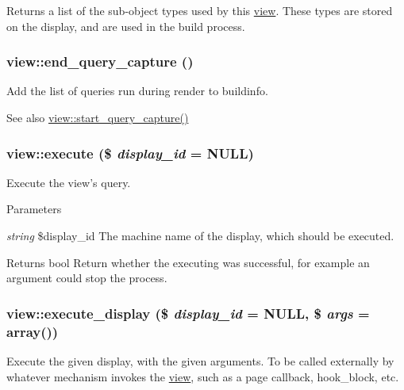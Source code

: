 \label{classview_a1338697759506981e17d1c4772b13aa6}
Returns a list of the sub-\/object types used by this \hyperlink{classview}{view}. These types are stored on the display, and are used in the build process. \hypertarget{classview_a7170a33aff32de00b1ff92ee4483cb88}{
\subsubsection[{end\_\-query\_\-capture}]{\setlength{\rightskip}{0pt plus 5cm}view::end\_\-query\_\-capture ()}}
\label{classview_a7170a33aff32de00b1ff92ee4483cb88}
Add the list of queries run during render to buildinfo.

\begin{DoxySeeAlso}{See also}
\hyperlink{classview_a1e3efc171324e713e7e130c445dbf84d}{view::start\_\-query\_\-capture()} 
\end{DoxySeeAlso}
\hypertarget{classview_ad33e492cac26ffd816fc9ba9361875d1}{
\subsubsection[{execute}]{\setlength{\rightskip}{0pt plus 5cm}view::execute (\$ {\em display\_\-id} = {\ttfamily NULL})}}
\label{classview_ad33e492cac26ffd816fc9ba9361875d1}
Execute the view's query.


\begin{DoxyParams}{Parameters}
\item[{\em string}]\$display\_\-id The machine name of the display, which should be executed.\end{DoxyParams}
\begin{DoxyReturn}{Returns}
bool Return whether the executing was successful, for example an argument could stop the process. 
\end{DoxyReturn}
\hypertarget{classview_a6b47b3882f4fea8e53a11c88f147973b}{
\subsubsection[{execute\_\-display}]{\setlength{\rightskip}{0pt plus 5cm}view::execute\_\-display (\$ {\em display\_\-id} = {\ttfamily NULL}, \/  \$ {\em args} = {\ttfamily array()})}}
\label{classview_a6b47b3882f4fea8e53a11c88f147973b}
Execute the given display, with the given arguments. To be called externally by whatever mechanism invokes the \hyperlink{classview}{view}, such as a page callback, hook\_\-block, etc.

